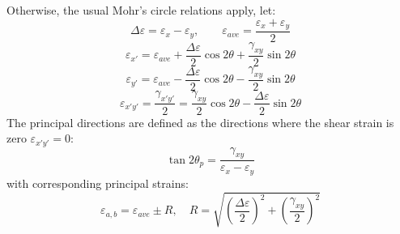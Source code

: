 ﻿\documentclass[12pt]{article}
\begin{document}
Otherwise, the usual Mohr's circle relations apply, let:
\[
\Delta\varepsilon=\varepsilon_x-\varepsilon_y,\qquad
\varepsilon_{ave}=\frac{\varepsilon_x+\varepsilon_y}{2}
\]
\[
\boxed{
\varepsilon_{x'}=\varepsilon_{ave}
+\frac{\Delta\varepsilon}{2}\cos2\theta
+\frac{\gamma_{xy}}{2}\sin2\theta
}
\]
\[
\boxed{
\varepsilon_{y'}=\varepsilon_{ave}
-\frac{\Delta\varepsilon}{2}\cos2\theta
-\frac{\gamma_{xy}}{2}\sin2\theta
}
\]
\[
\boxed{\varepsilon_{x'y'}=
\frac{\gamma_{x'y'}}{2}
=\frac{\gamma_{xy}}{2}\cos2\theta
-\frac{\Delta\varepsilon}{2}\sin2\theta
}
\]
The principal directions are defined as the directions where the shear strain is zero \(\varepsilon_{x'y'}=0\):
\[
\boxed{\tan2\theta_p=\frac{\gamma_{xy}}{\varepsilon_x-\varepsilon_y}}
\]
with corresponding principal strains:
\[
\boxed{
\varepsilon_{a,b}=\varepsilon_{ave}\pm R,\quad 
R=\sqrt{
\left(\frac{\Delta\varepsilon}{2}\right)^2+
\left(\frac{\gamma_{xy}}{2}\right)^2
}}
\]
\end{document}
